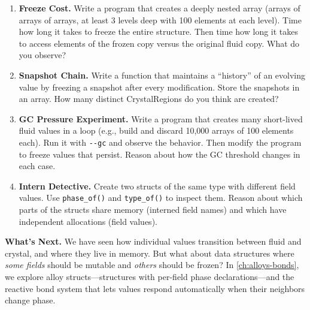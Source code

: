 \begin{enumerate}
  \item \textbf{Freeze Cost.}
    Write a program that creates a deeply nested array (arrays of arrays of arrays, at least 3 levels deep with 100 elements at each level).
    Time how long it takes to freeze the entire structure.
    Then time how long it takes to access elements of the frozen copy versus the original fluid copy.
    What do you observe?

  \item \textbf{Snapshot Chain.}
    Write a function that maintains a ``history'' of an evolving value by freezing a snapshot after every modification.
    Store the snapshots in an array.
    How many distinct CrystalRegions do you think are created?

  \item \textbf{GC Pressure Experiment.}
    Write a program that creates many short-lived fluid values in a loop (e.g., build and discard 10,000 arrays of 100 elements each).
    Run it with \lstinline|--gc| and observe the behavior.
    Then modify the program to freeze values that persist.
    Reason about how the GC threshold changes in each case.

  \item \textbf{Intern Detective.}
    Create two structs of the same type with different field values.
    Use \lstinline|phase_of()| and \lstinline|type_of()| to inspect them.
    Reason about which parts of the structs share memory (interned field names) and which have independent allocations (field values).
\end{enumerate}

\bigskip

\noindent\textbf{What's Next.}\quad
We have seen how individual values transition between fluid and crystal, and where they live in memory.
But what about data structures where \emph{some fields} should be mutable and \emph{others} should be frozen?
In \cref{ch:alloys-bonds}, we explore alloy structs---structures with per-field phase declarations---and the reactive bond system that lets values respond automatically when their neighbors change phase.

